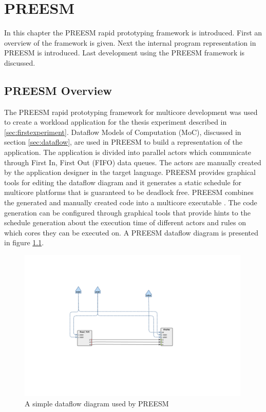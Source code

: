 \chapter{PREESM}
\label{chapter:preesm}
In this chapter the PREESM rapid prototyping framework is introduced. First an
overview of the framework is given. Next the internal program representation in
PREESM is introduced. Last development using the PREESM framework is discussed.

\section{PREESM Overview}
\label{sec:preesmover}
The PREESM rapid prototyping framework for multicore development was used to
create a workload application for the thesis experiment described in
\ref{sec:firstexperiment}. Dataflow Models of Computation (MoC), discussed in
section \ref{sec:dataflow}, are used in PREESM to build a representation of the
application. The application is divided into parallel actors which communicate
through First In, First Out (FIFO) data queues. The actors are manually created
by the application designer in the target language. PREESM provides graphical
tools for editing the dataflow diagram and it generates a static schedule for
multicore platforms that is guaranteed to be deadlock free. PREESM combines the
generated and manually created code into a multicore executable
\cite{pelcat2014preesm}. The code generation can be configured through graphical
tools that provide hints to the schedule generation about the execution time of
different actors and rules on which cores they can be executed on. A PREESM
dataflow diagram is presented in figure \ref{preesm_example}.

\begin{figure}[h!] \label{preesm_example} \begin{center}
    \includegraphics[width=0.99\textwidth]{images/example_preesm_diagram.png}
    \caption{A simple dataflow diagram used by PREESM} \end{center}
\end{figure}

